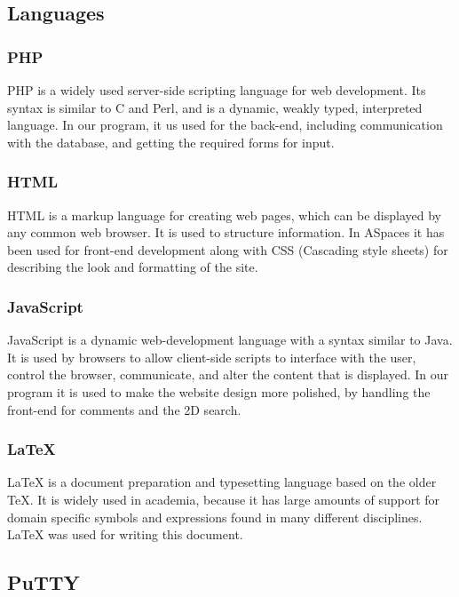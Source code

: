 \subsection{Languages}
\label{subsec:PlanningSoftwareDevLanguages}

\subsubsection{PHP} PHP is a widely used server-side scripting language for web development. Its syntax is similar to C and Perl, and is a dynamic, weakly typed, interpreted language. In our program, it us used for the back-end, including communication with the database, and getting the required forms for input.

\subsubsection{HTML} HTML is a markup language for creating web pages, which can be displayed by any common web browser. It is used to structure information. In ASpaces it has been used for front-end development along with CSS (Cascading style sheets) for describing the look and formatting of the site.

\subsubsection{JavaScript} JavaScript is a dynamic web-development language with a syntax similar to Java. It is used by browsers to allow client-side scripts to interface with the user, control the browser, communicate, and alter the content that is displayed. In our program it is used to make the website design more polished, by handling the front-end for comments and the 2D search.

\subsubsection{LaTeX} LaTeX is a document preparation and typesetting language based on the older TeX. It is widely used in academia, because it has large amounts of support for domain specific symbols and expressions found in many different disciplines. LaTeX was used for writing this document.

\subsection{PuTTY} 
\label{subsec:PlanningSoftwareDevPutty}

